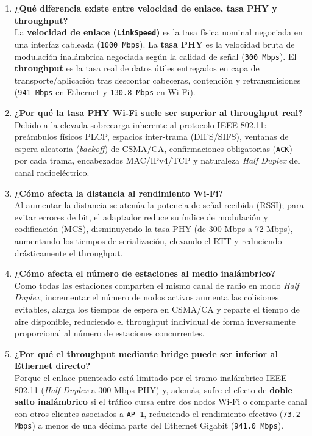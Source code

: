 \documentclass[11pt, a4paper]{article}
\begin{document}
\begin{enumerate}
    \item \textbf{¿Qué diferencia existe entre velocidad de enlace, tasa PHY y throughput?} \\
    La \textbf{velocidad de enlace (\texttt{LinkSpeed})} es la tasa física nominal negociada en una interfaz cableada (\texttt{1000 Mbps}). La \textbf{tasa PHY} es la velocidad bruta de modulación inalámbrica negociada según la calidad de señal (\texttt{300 Mbps}). El \textbf{throughput} es la tasa real de datos útiles entregados en capa de transporte/aplicación tras descontar cabeceras, contención y retransmisiones (\texttt{941 Mbps} en Ethernet y \texttt{130.8 Mbps} en Wi-Fi).
    \item \textbf{¿Por qué la tasa PHY Wi-Fi suele ser superior al throughput real?} \\
    Debido a la elevada sobrecarga inherente al protocolo IEEE 802.11: preámbulos físicos PLCP, espacios inter-trama (DIFS/SIFS), ventanas de espera aleatoria (\textit{backoff}) de CSMA/CA, confirmaciones obligatorias (\texttt{ACK}) por cada trama, encabezados MAC/IPv4/TCP y naturaleza \textit{Half Duplex} del canal radioeléctrico.
    \item \textbf{¿Cómo afecta la distancia al rendimiento Wi-Fi?} \\
    Al aumentar la distancia se atenúa la potencia de señal recibida (RSSI); para evitar errores de bit, el adaptador reduce su índice de modulación y codificación (MCS), disminuyendo la tasa PHY (de 300 Mbps a 72 Mbps), aumentando los tiempos de serialización, elevando el RTT y reduciendo drásticamente el throughput.
    \item \textbf{¿Cómo afecta el número de estaciones al medio inalámbrico?} \\
    Como todas las estaciones comparten el mismo canal de radio en modo \textit{Half Duplex}, incrementar el número de nodos activos aumenta las colisiones evitables, alarga los tiempos de espera en CSMA/CA y reparte el tiempo de aire disponible, reduciendo el throughput individual de forma inversamente proporcional al número de estaciones concurrentes.
    \item \textbf{¿Por qué el throughput mediante bridge puede ser inferior al Ethernet directo?} \\
    Porque el enlace puenteado está limitado por el tramo inalámbrico IEEE 802.11 (\textit{Half Duplex} a 300 Mbps PHY) y, además, sufre el efecto de \textbf{doble salto inalámbrico} si el tráfico cursa entre dos nodos Wi-Fi o comparte canal con otros clientes asociados a \texttt{AP-1}, reduciendo el rendimiento efectivo (\texttt{73.2 Mbps}) a menos de una décima parte del Ethernet Gigabit (\texttt{941.0 Mbps}).

\end{enumerate}
\end{document}
